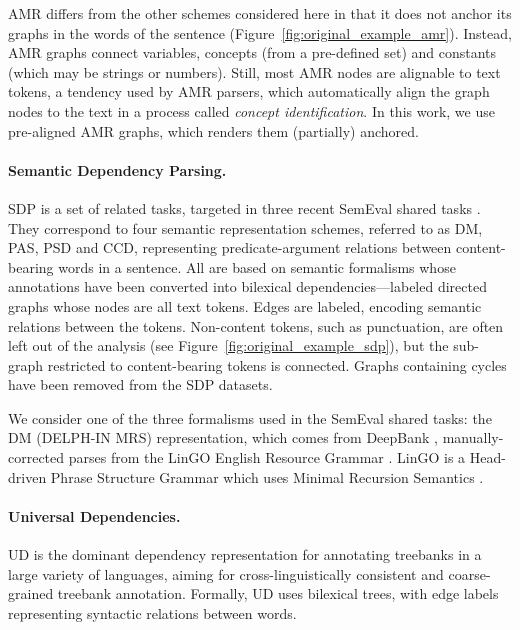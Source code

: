 \documentclass[11pt,a4paper]{article}
\begin{document}
AMR differs from the other schemes considered here in that it does not anchor its graphs
in the words of the sentence (Figure~\ref{fig:original_example_amr}). Instead, AMR graphs
connect variables, concepts (from a pre-defined set) and constants (which may be strings or numbers).
Still, most AMR nodes are alignable to text tokens, a tendency used by AMR parsers,
which automatically align the graph nodes to the text in a process called \textit{concept identification}.
In this work, we use pre-aligned AMR graphs, which renders them (partially) anchored.


\paragraph{Semantic Dependency Parsing.}\label{sec:sdp}

SDP is a set of related tasks, targeted in three recent SemEval shared tasks 
\cite{oepen2014semeval,oepen2015semeval,oepen2016towards}.
They correspond to four semantic representation schemes, referred to as
DM, PAS, PSD and CCD, representing
predicate-argument relations between content-bearing words in a sentence.
All are based on semantic formalisms whose annotations have been
converted into bilexical dependencies---labeled
directed graphs whose nodes are all text tokens.
Edges are labeled, encoding semantic relations between the tokens.
Non-content tokens, such as punctuation,
are often left out of the analysis (see Figure~\ref{fig:original_example_sdp}),
but the sub-graph restricted to content-bearing tokens is connected.
Graphs containing cycles have been removed from the SDP datasets.

We consider one of the three formalisms used in the SemEval shared tasks:
the DM (DELPH-IN MRS) representation, which comes
from DeepBank \cite{flickinger2012deepbank},
manually-corrected parses from the LinGO
English Resource Grammar \cite{copestake2000open}.
LinGO is a Head-driven Phrase
Structure Grammar \cite[HPSG; ][]{pollard1994head}
which uses Minimal Recursion Semantics \cite{copestake2005minimal}.

\paragraph{Universal Dependencies.}\label{sec:ud}
UD \cite{nivre2016universal,11234/1-2515} is
the dominant dependency representation for
annotating treebanks in a large variety of languages,
aiming for cross-linguistically consistent and coarse-grained treebank
annotation. Formally, UD uses bilexical trees, with edge labels 
representing syntactic relations between words.
\end{document}
